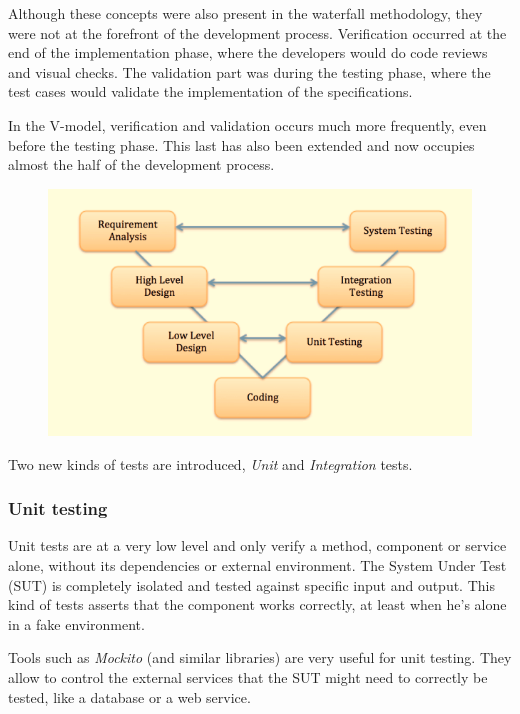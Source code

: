 Although these concepts were also present in the waterfall methodology, they
were not at the forefront of the development process.
Verification occurred at the end of the implementation phase, where the
developers would do code reviews and visual checks.
The validation part was during the testing phase, where the test cases
would validate the implementation of the specifications.

In the V-model, verification and validation occurs much more frequently,
even before the testing phase.
This last has also been extended and now occupies almost the half of the
development process.

\begin{figure}
    \includegraphics[width=\textwidth]{../../resources/images/waterfall/v_model.png}
\end{figure}

Two new kinds of tests are introduced, \textit{Unit} and \textit{Integration}
tests.

\subsubsection{Unit testing}
Unit tests are at a very low level and only verify  a method, component or
service alone, without its dependencies or external environment.
The System Under Test (SUT) is completely isolated and tested against specific
input and output.
This kind of tests asserts that the component works correctly, at least when
he's alone in a fake environment.

Tools such as \textit{Mockito} (and similar libraries) are very useful for
unit testing.
They allow to control the external services that the SUT might need to
correctly be tested, like a database or a web service.

